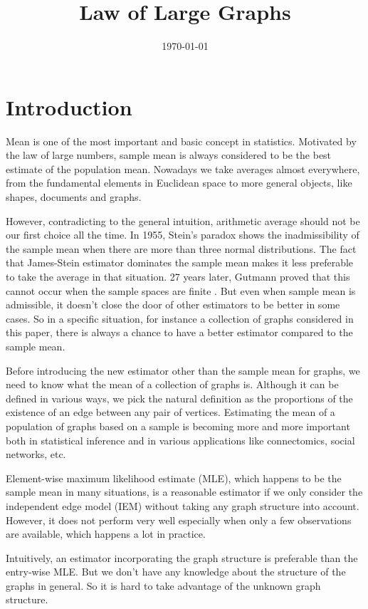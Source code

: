 \documentclass[a4paper]{article}
\title{Law of Large Graphs}
\date{\today}
\begin{document}
\maketitle

\section{Introduction}

Mean is one of the most important and basic concept in statistics. Motivated by the law of large numbers, sample mean is always considered to be the best estimate of the population mean. Nowadays we take averages almost everywhere, from the fundamental elements in Euclidean space to more general objects, like shapes, documents and graphs.

However, contradicting to the general intuition, arithmetic average should not be our first choice all the time. In 1955, Stein's paradox \cite{efron1977stein} shows the inadmissibility of the sample mean when there are more than three normal distributions. The fact that James-Stein estimator dominates the sample mean makes it less preferable to take the average in that situation. 27 years later, Gutmann proved that this cannot occur when the sample spaces are finite \cite{gutmann1982stein}. But even when sample mean is admissible, it doesn't close the door of other estimators to be better in some cases. So in a specific situation, for instance a collection of graphs considered in this paper, there is always a chance to have a better estimator compared to the sample mean.

Before introducing the new estimator other than the sample mean for graphs, we need to know what the mean of a collection of graphs is. Although it can be defined in various ways, we pick the natural definition as the proportions of the existence of an edge between any pair of vertices. Estimating the mean of a population of graphs based on a sample is becoming more and more important both in statistical inference and in various applications like connectomics, social networks, etc.

Element-wise maximum likelihood estimate (MLE), which happens to be the sample mean in many situations, is a reasonable estimator if we only consider the independent edge model (IEM) \cite{bollobas2007phase} without taking any graph structure into account. However, it does not perform very well especially when only a few observations are available, which happens a lot in practice.

Intuitively, an estimator incorporating the graph structure is preferable than the entry-wise MLE. But we don't have any knowledge about the structure of the graphs in general. So it is hard to take advantage of the unknown graph structure.
\end{document}
